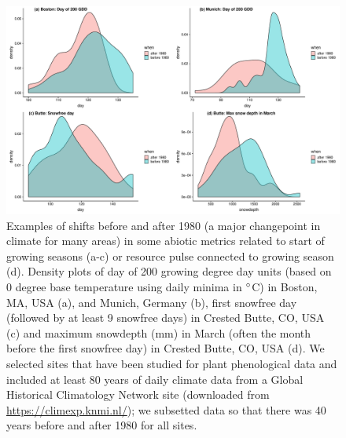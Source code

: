 \documentclass[11pt,letterpaper]{article}
\begin{document}
\clearpage

\begin{figure}[t!]
\centering
\includegraphics[width=1\textwidth]{..//..//R/graphs/otherdat/climdata.pdf}
\caption{Examples of shifts before and after 1980 (a major changepoint in climate for many areas) in some abiotic metrics related to start of growing seasons (a-c) or resource pulse connected to growing season (d). Density plots of day of 200 growing degree day units (based on 0 degree base temperature using daily minima in $\degree$C) in Boston, MA, USA (a), and Munich, Germany (b), first snowfree day (followed by at least 9 snowfree days) in Crested Butte, CO, USA (c) and maximum snowdepth (mm) in March (often the month before the first snowfree day) in Crested Butte, CO, USA (d). We selected sites that have been studied for plant phenological data and included at least 80 years of daily climate data from a Global Historical Climatology Network site (downloaded from \url{https://climexp.knmi.nl/}); we subsetted data so that there was 40 years before and after 1980 for all sites.}
 \label{fig:climdat}
\end{figure}
\end{document}
